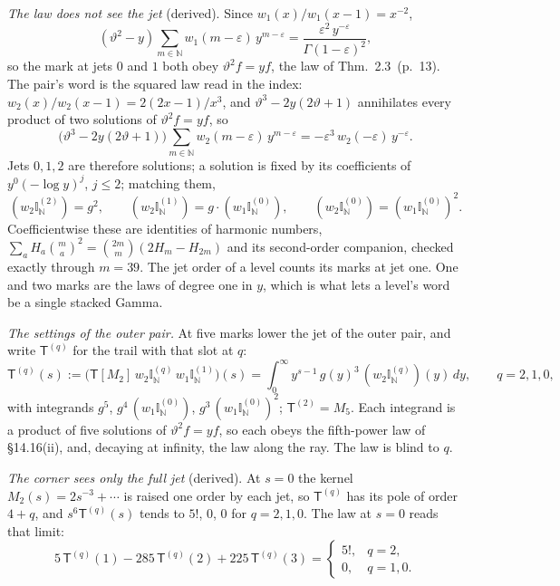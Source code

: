 \documentclass[11pt]{article}
\newcommand{\sT}{\mathsf T}
\newcommand{\hb}[2]{#1~(p.~#2)}   %
\theoremstyle{plain}
\theoremstyle{remark}
\begin{document}
\emph{The law does not see the jet} (derived). Since $w_1(x)/w_1(x-1)=x^{-2}$,
\[
(\vartheta^2-y)\sum_{m\in\mathbb N}w_1(m-\varepsilon)\,y^{m-\varepsilon}=\frac{\varepsilon^2\,y^{-\varepsilon}}{\Gamma(1-\varepsilon)^2},
\]
so the mark at jets $0$ and $1$ both obey $\vartheta^2f=yf$, the law of Thm.~\hb{2.3}{13}. The pair's word is the squared law read in the index: $w_2(x)/w_2(x-1)=2(2x-1)/x^3$, and $\vartheta^3-2y(2\vartheta+1)$ annihilates every product of two solutions of $\vartheta^2f=yf$, so
\[
\big(\vartheta^3-2y(2\vartheta+1)\big)\sum_{m\in\mathbb N}w_2(m-\varepsilon)\,y^{m-\varepsilon}=-\varepsilon^3\,w_2(-\varepsilon)\,y^{-\varepsilon}.
\]
Jets $0,1,2$ are therefore solutions; a solution is fixed by its coefficients of $y^0(-\log y)^j$, $j\le2$; matching them,
\[
(w_2\mathbb I^{(2)}_{\mathbb N})=g^2,\qquad (w_2\mathbb I^{(1)}_{\mathbb N})=g\cdot(w_1\mathbb I^{(0)}_{\mathbb N}),\qquad (w_2\mathbb I^{(0)}_{\mathbb N})=(w_1\mathbb I^{(0)}_{\mathbb N})^2 .
\]
Coefficientwise these are identities of harmonic numbers, $\sum_aH_a\binom ma^2=\binom{2m}m(2H_m-H_{2m})$ and its second-order companion, checked exactly through $m=39$. The jet order of a level counts its marks at jet one. One and two marks are the laws of degree one in $y$, which is what lets a level's word be a single stacked Gamma.

\emph{The settings of the outer pair.} At five marks lower the jet of the outer pair, and write $\sT^{(q)}$ for the trail with that slot at $q$:
\[
\sT^{(q)}(s):=\big(\sT[M_2]\,w_2\mathbb I^{(q)}_{\mathbb N}\,w_1\mathbb I^{(1)}_{\mathbb N}\big)(s)=\int_0^\infty y^{s-1}\,g(y)^3\,(w_2\mathbb I^{(q)}_{\mathbb N})(y)\,dy,\qquad q=2,1,0,
\]
with integrands $g^5$, $g^4\,(w_1\mathbb I^{(0)}_{\mathbb N})$, $g^3\,(w_1\mathbb I^{(0)}_{\mathbb N})^2$; $\sT^{(2)}=M_5$. Each integrand is a product of five solutions of $\vartheta^2f=yf$, so each obeys the fifth-power law of \S14.16(ii), and, decaying at infinity, the law along the ray. The law is blind to $q$.

\emph{The corner sees only the full jet} (derived). At $s=0$ the kernel $M_2(s)=2s^{-3}+\cdots$ is raised one order by each jet, so $\sT^{(q)}$ has its pole of order $4+q$, and $s^6\sT^{(q)}(s)$ tends to $5!$, $0$, $0$ for $q=2,1,0$. The law at $s=0$ reads that limit:
\[
5\,\sT^{(q)}(1)-285\,\sT^{(q)}(2)+225\,\sT^{(q)}(3)=\begin{cases}5!,&q=2,\\0,&q=1,0.\end{cases}
\]
\end{document}
